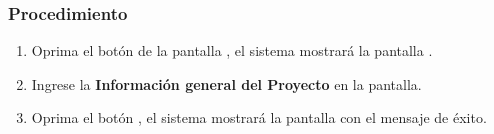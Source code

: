 \subsubsection{Procedimiento}
\begin{enumerate}
	\item Oprima el botón  de la pantalla , el sistema mostrará la pantalla . 

	
	\item Ingrese la \textbf{Información general del Proyecto} en la pantalla.
	
	\item Oprima el botón , el sistema mostrará la pantalla  con el mensaje de éxito.
\end{enumerate}

